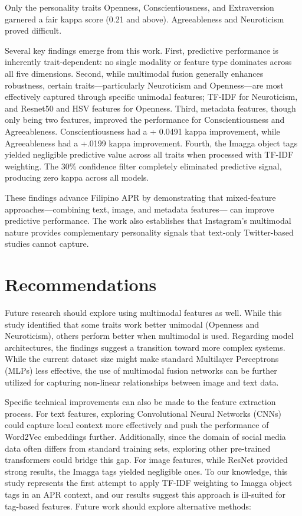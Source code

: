 Only the personality traits Openness, Conscientiousness, and Extraversion garnered a fair kappa score (0.21 and above). Agreeableness and Neuroticism proved difficult.

Several key findings emerge from this work. First, predictive performance is inherently trait-dependent: no single modality or feature type dominates across all five dimensions. Second, while multimodal fusion generally enhances robustness, certain traits—particularly Neuroticism and Openness—are most effectively captured through specific unimodal features; TF-IDF for Neuroticism, and Resnet50 and HSV features for Openness. Third, metadata features, though only being two features, improved the performance for Conscientiousness and Agreeableness. Conscientiousness had a + 0.0491 kappa improvement, while Agreeableness had a +.0199 kappa improvement. Fourth, the Imagga object tags yielded negligible predictive value across all traits when processed with TF-IDF weighting. The 30\% confidence filter completely eliminated predictive signal, producing zero kappa across all models.

These findings advance Filipino APR by demonstrating that mixed-feature approaches—combining text, image, and metadata features— can improve predictive performance. The work also establishes that Instagram's multimodal nature provides complementary personality signals that text-only Twitter-based studies cannot capture.
\section{Recommendations}
\label{sec:recommendations}

Future research should explore using multimodal features as well. While this study identified that some traits work better unimodal (Openness and Neuroticism), others perform better when multimodal is used. Regarding model architectures, the findings suggest a transition toward more complex systems. While the current dataset size might make standard Multilayer Perceptrons (MLPs) less effective, the use of multimodal fusion networks can be further utilized for capturing non-linear relationships between image and text data.

Specific technical improvements can also be made to the feature extraction process. For text features, exploring Convolutional Neural Networks (CNNs) could capture local context more effectively and push the performance of Word2Vec embeddings further. Additionally, since the domain of social media data often differs from standard training sets, exploring other pre-trained transformers could bridge this gap. For image features, while ResNet provided strong results, the Imagga tags yielded negligible ones. To our knowledge, this study represents the first attempt to apply TF-IDF weighting to Imagga object tags in an APR context, and our results suggest this approach is ill-suited for tag-based features. Future work should explore alternative methods:

